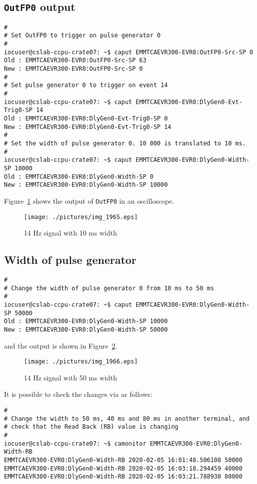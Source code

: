 \documentclass[11pt
  , a4paper
  , article
  , oneside
  , showtrims
]{memoir}
\begin{document}
{\subsection{\texttt{OutFP0} output}
\begin{lstlisting}[style=termstyle]
#
# Set OutFP0 to trigger on pulse generator 0
#
iocuser@cslab-ccpu-crate07: ~$ caput EMMTCAEVR300-EVR0:OutFP0-Src-SP 0
Old : EMMTCAEVR300-EVR0:OutFP0-Src-SP 63
New : EMMTCAEVR300-EVR0:OutFP0-Src-SP 0
#
# Set pulse generator 0 to trigger on event 14
#
iocuser@cslab-ccpu-crate07: ~$ caput EMMTCAEVR300-EVR0:DlyGen0-Evt-Trig0-SP 14
Old : EMMTCAEVR300-EVR0:DlyGen0-Evt-Trig0-SP 0
New : EMMTCAEVR300-EVR0:DlyGen0-Evt-Trig0-SP 14
#
# Set the width of pulse generator 0. 10 000 is translated to 10 ms.
#
iocuser@cslab-ccpu-crate07: ~$ caput EMMTCAEVR300-EVR0:DlyGen0-Width-SP 10000
Old : EMMTCAEVR300-EVR0:DlyGen0-Width-SP 0
New : EMMTCAEVR300-EVR0:DlyGen0-Width-SP 10000
\end{lstlisting}

Figure~\ref{fig:14Hz} shows the output of \texttt{OutFP0} in an oscilloscope.\\

\begin{figure}[!ht]
  \centering
    \texttt{[image: ./pictures/img\_1965.eps]}
  \caption{14 Hz signal with 10 ms width}
  \label{fig:14Hz}
\end{figure}

\subsection{Width of pulse generator}
\begin{lstlisting}[style=termstyle]
#
# Change the width of pulse generator 0 from 10 ms to 50 ms
#
iocuser@cslab-ccpu-crate07: ~$ caput EMMTCAEVR300-EVR0:DlyGen0-Width-SP 50000
Old : EMMTCAEVR300-EVR0:DlyGen0-Width-SP 10000
New : EMMTCAEVR300-EVR0:DlyGen0-Width-SP 50000
\end{lstlisting}
and the output is shown in Figure~\ref{fig:50ms}.\\

\begin{figure}[!ht]
  \centering
    \texttt{[image: ./pictures/img\_1966.eps]}
  \caption{14 Hz signal with 50 ms width}
  \label{fig:50ms}
\end{figure}

It is possible to check the changes via  as follows:
\begin{lstlisting}[style=termstyle]
#
# Change the width to 50 ms, 40 ms and 80 ms in another terminal, and
# check that the Read Back (RB) value is changing
#
iocuser@cslab-ccpu-crate07: ~$ camonitor EMMTCAEVR300-EVR0:DlyGen0-Width-RB
EMMTCAEVR300-EVR0:DlyGen0-Width-RB 2020-02-05 16:01:48.506108 50000
EMMTCAEVR300-EVR0:DlyGen0-Width-RB 2020-02-05 16:03:18.294459 40000
EMMTCAEVR300-EVR0:DlyGen0-Width-RB 2020-02-05 16:03:21.788930 80000
\end{lstlisting}

}
\end{document}
